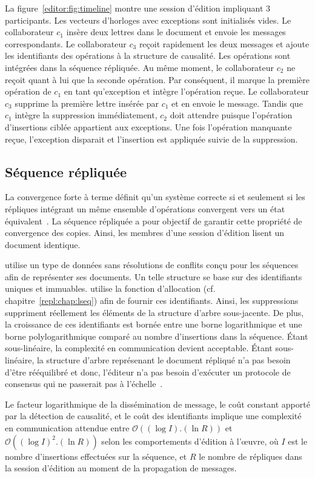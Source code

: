 La figure~\ref{editor:fig:timeline} montre une session d'édition impliquant 3
participants. Les vecteurs d'horloges avec exceptions sont initialisés vides. Le
collaborateur $c_1$ insère deux lettres dans le document et envoie les messages
correspondants. Le collaborateur $c_3$ reçoit rapidement les deux messages et
ajoute les identifiants des opérations à la structure de causalité. Les
opérations sont intégrées dans la séquence répliquée. Au même moment, le
collaborateur $c_2$ ne reçoit quant à lui que la seconde opération. Par
conséquent, il marque la première opération de $c_1$ en tant qu'exception et
intègre l'opération reçue. Le collaborateur $c_3$ supprime la première lettre
insérée par $c_1$ et en envoie le message. Tandis que $c_1$ intègre la
suppression immédiatement, $c_2$ doit attendre puisque l'opération d'insertions
ciblée appartient aux exceptions. Une fois l'opération manquante reçue,
l'exception disparait et l'insertion est appliquée suivie de la suppression.

\subsection{Séquence répliquée}

La convergence forte à terme définit qu'un système correcte si et seulement si
les répliques intégrant un même ensemble d'opérations convergent vers un état
équivalent~\cite{shapiro2011conflict}. La séquence répliquée a pour objectif de
garantir cette propriété de convergence des copies. Ainsi, les membres d'une
session d'édition lisent un document identique.

\CRATE utilise un type de données sans résolutions de conflits conçu pour les
séquences afin de représenter ses documents. Un telle structure se base sur des
identifiants uniques et immuables. \CRATE utilise la fonction d'allocation \LSEQ
(cf. chapitre~\ref{repl:chap:lseq}) afin de fournir ces identifiants. Ainsi, les
suppressions suppriment réellement les éléments de la structure d'arbre
sous-jacente. De plus, la croissance de ces identifiants est bornée entre une
borne logarithmique et une borne polylogarithmique comparé au nombre
d'insertions dans la séquence. Étant sous-linéaire, la complexité en
communication devient acceptable. Étant sous-linéaire, la structure d'arbre
représenant le document répliqué n'a pas besoin d'être rééquilibré et donc,
l'éditeur n'a pas besoin d'exécuter un protocole de consensus qui ne passerait
pas à l'échelle~\cite{mostefaoui2015signature}.

Le facteur logarithmique de la dissémination de message, le coût constant
apporté par la détection de causalité, et le coût des identifiants implique une
complexité en communication attendue entre $\mathcal{O}((\log I).(\ln R))$ et
$\mathcal{O}((\log I)^2.(\ln R))$ selon les comportements d'édition à l'œuvre,
où $I$ est le nombre d'insertions effectuées sur la séquence, et $R$ le nombre
de répliques dans la session d'édition au moment de la propagation de messages.


